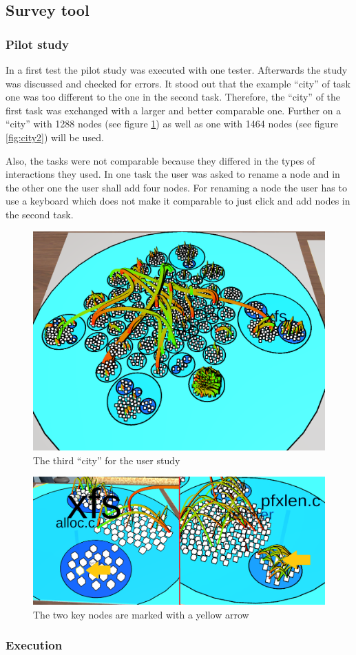 \subsection{Survey tool}
\subsubsection{Pilot study}
In a first test the pilot study was executed with one tester. 
Afterwards the study was discussed and checked for errors. 
It stood out that the example \enquote{\gls{city}} of task one was too different to the one in the second task.
Therefore, the \enquote{\gls{city}} of the first task was exchanged with a larger and better comparable one.
Further on a \enquote{\gls{city}} with 1288 nodes (see figure \ref{fig:city3}) as well as one with 1464 nodes (see figure \ref{fig:city2}) will be used.

Also, the tasks were not comparable because they differed in the types of interactions they used.
In one task the user was asked to rename a node and in the other one the user shall add four nodes.
For renaming a node the user has to use a keyboard which does not make it comparable to just click and add nodes in the second task.


\begin{figure}[htb]
    \centering
    \includegraphics[width=1\textwidth]{Evaluation/img/city_3.png}
    \caption{The third \enquote{\gls{city}} for the user study}\label{fig:city3}
\end{figure}

\begin{figure}[htb]
    \centering
    \includegraphics[width=1\textwidth]{Evaluation/img/task1.png}
    \caption{The two key nodes are marked with a yellow arrow}\label{fig:task1}
\end{figure}
\subsubsection{Execution}